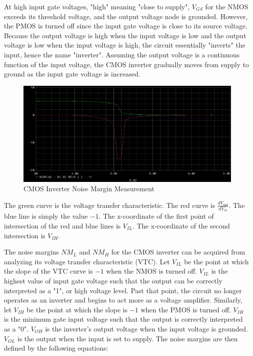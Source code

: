 At high input gate voltages, "high" meaning "close to supply", $V_{GS}$ for the NMOS exceeds its threshold voltage, and the output voltage node is grounded. However, the PMOS is turned off since the input gate voltage is close to its source voltage. Because the output voltage is high when the input voltage is low and the output voltage is low when the input voltage is high, the circuit essentially "inverts" the input, hence the name "inverter". Assuming the output voltage is a continuous function of the input voltage, the CMOS inverter gradually moves from supply to ground as the input gate voltage is increased. \\

\FloatBarrier

\begin{figure}[h!]
	\centering
	\includegraphics[scale=0.50]{./images/circuit1_noisemargin_measure.PNG}
	\caption{CMOS Inverter Noise Margin Measurement}
	\label{fig:circuit1_noisemargin_measure}
\end{figure}

\FloatBarrier

{\footnotesize The green curve is the voltage transfer characteristic. The red curve is $\frac{dV_{out}}{dV_{in}}$. The blue line is simply the value $-1$. The x-coordinate of the first point of intersection of the red and blue lines is $V_{IL}$. The x-coordinate of the second intersection is $V_{IH}$.}

\FloatBarrier

The noise margins $NM_{L}$ and $NM_{H}$ for the CMOS inverter can be acquired from analyzing its voltage transfer characteristic (VTC). Let $V_{IL}$ be the point at which the slope of the VTC curve is $-1$ when the NMOS is turned off. $V_{IL}$ is the highest value of input gate voltage such that the output can be correctly interpreted as a "1", or high voltage level. Past that point, the circuit no longer operates as an inverter and begins to act more as a voltage amplifier. Similarly, let $V_{IH}$ be the point at which the slope is $-1$ when the PMOS is turned off. $V_{IH}$ is the minimum gate input voltage such that the output is correctly interpreted as a "0". $V_{OH}$ is the inverter's output voltage when the input voltage is grounded. $V_{OL}$ is the output when the input is set to supply. The noise margins are then defined by the following equations:

